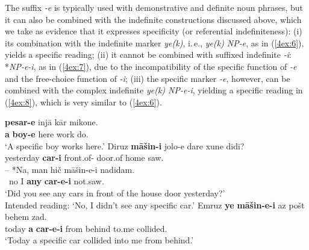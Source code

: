 \documentclass[output=paper]{langsci/langscibook}
\begin{document}
{
The suffix {\emph{-e}} is typically used with demonstrative and definite noun phrases, but it can also be combined with the indefinite constructions discussed above, which we take as evidence that it expresses specificity (or referential indefiniteness): (i) its combination with the indefinite marker {\emph{ye(k)}}, i.\,e., {\emph{ye(k) NP-e}}, as in (\ref{4ex:6}), yields a specific reading; (ii) it cannot be combined with suffixed indefinite {\emph{-i}}: *{\emph{NP-e-i}}, as in (\ref{4ex:7}), due to the incompatibility of the specific function of {\emph{-e}} and the free-choice function of {\emph{-i}}; (iii) the specific marker {\emph{-e}}, however, can be combined with the complex indefinite {\emph{ye(k) NP-e-i}}, yielding a specific reading in (\ref{4ex:8}), which is very similar to (\ref{4ex:6}).
}

\begin{exe}
\ex\label{4ex:6}
	{\bf{pesar-e}}	injā	kār	mikone. \\
	{\bf{a}}	{\bf{boy-e}}	here	work	do.{} \\
\glt	`A specific boy works here.'
\ex\label{4ex:7}
\gll	Diruz		{\bf{māšin-i}} jolo-e       dare      	xune  didi?       			\\
	yesterday	{\bf{car-i}}	    front.of-{} 	door.of 	home saw.{} 	\\
\glt
\exi{}
\gll	– *Na, man hič 	māšin-e-i  	nadidam. \\
	{} \ no I {\bf{any}} {\bf{car-e-i}}   not.saw.{} \\ 
\glt	`Did you see any cars in front of the house door yesterday?' \\
	Intended reading: `No, I didn't see any specific car.'
\ex\label{4ex:8}
\gll	Emruz	{\bf{ye}}	{\bf{māšin-e-i}}		az		pošt		behem 		zad. \\
 	today	{\bf{a}} 	{\bf{car-e-i}} 	 	from		behind	to.me		collided.{} \\
\glt	`Today a specific car collided into me from behind.'
\end{exe}
\end{document}
